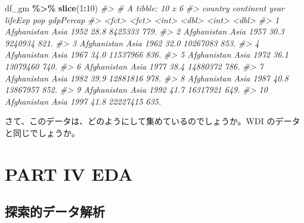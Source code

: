 \documentclass[
  xelatex, ja=standard]{bxjsbook}
\newenvironment{Shaded}{\begin{snugshade}}{\end{snugshade}}
\newcommand{\CommentTok}[1]{\textcolor[rgb]{0.56,0.35,0.01}{\textit{#1}}}
\newcommand{\DecValTok}[1]{\textcolor[rgb]{0.00,0.00,0.81}{#1}}
\newcommand{\FunctionTok}[1]{\textcolor[rgb]{0.13,0.29,0.53}{\textbf{#1}}}
\newcommand{\NormalTok}[1]{#1}
\newcommand{\SpecialCharTok}[1]{\textcolor[rgb]{0.81,0.36,0.00}{\textbf{#1}}}
\theoremstyle{definition}
\theoremstyle{definition}
\theoremstyle{definition}
\theoremstyle{definition}
\theoremstyle{remark}
\begin{document}
\begin{Shaded}
\begin{Highlighting}[]
\NormalTok{df\_gm }\SpecialCharTok{\%\textgreater{}\%} \FunctionTok{slice}\NormalTok{(}\DecValTok{1}\SpecialCharTok{:}\DecValTok{10}\NormalTok{)}
\CommentTok{\#\textgreater{} \# A tibble: 10 x 6}
\CommentTok{\#\textgreater{}    country     continent  year lifeExp      pop gdpPercap}
\CommentTok{\#\textgreater{}    \textless{}fct\textgreater{}       \textless{}fct\textgreater{}     \textless{}int\textgreater{}   \textless{}dbl\textgreater{}    \textless{}int\textgreater{}     \textless{}dbl\textgreater{}}
\CommentTok{\#\textgreater{}  1 Afghanistan Asia       1952    28.8  8425333      779.}
\CommentTok{\#\textgreater{}  2 Afghanistan Asia       1957    30.3  9240934      821.}
\CommentTok{\#\textgreater{}  3 Afghanistan Asia       1962    32.0 10267083      853.}
\CommentTok{\#\textgreater{}  4 Afghanistan Asia       1967    34.0 11537966      836.}
\CommentTok{\#\textgreater{}  5 Afghanistan Asia       1972    36.1 13079460      740.}
\CommentTok{\#\textgreater{}  6 Afghanistan Asia       1977    38.4 14880372      786.}
\CommentTok{\#\textgreater{}  7 Afghanistan Asia       1982    39.9 12881816      978.}
\CommentTok{\#\textgreater{}  8 Afghanistan Asia       1987    40.8 13867957      852.}
\CommentTok{\#\textgreater{}  9 Afghanistan Asia       1992    41.7 16317921      649.}
\CommentTok{\#\textgreater{} 10 Afghanistan Asia       1997    41.8 22227415      635.}
\end{Highlighting}
\end{Shaded}

さて、このデータは、どのようにして集めているのでしょうか。WDI のデータと同じでしょうか。

\hypertarget{section-2}{%
\section{}\label{section-2}}

\hypertarget{section-3}{%
\section{}\label{section-3}}

\hypertarget{part-part-iv-eda}{%
\part{PART IV EDA}\label{part-part-iv-eda}}

\hypertarget{intro2eda}{%
\chapter{探索的データ解析}\label{intro2eda}}
\end{document}

